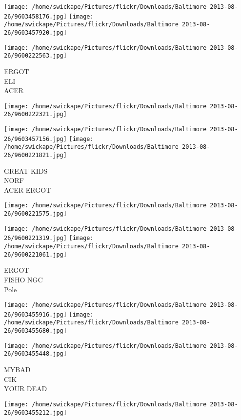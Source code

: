 \documentclass[10pt,letterpaper]{article}
\begin{document}
\texttt{[image: /home/swickape/Pictures/flickr/Downloads/Baltimore 2013-08-26/9603458176.jpg]}
\texttt{[image: /home/swickape/Pictures/flickr/Downloads/Baltimore 2013-08-26/9603457920.jpg]}

\texttt{[image: /home/swickape/Pictures/flickr/Downloads/Baltimore 2013-08-26/9600222563.jpg]}

ERGOT\\
ELI\\
ACER\\
\pagebreak

\texttt{[image: /home/swickape/Pictures/flickr/Downloads/Baltimore 2013-08-26/9600222321.jpg]}

\vspace{0.25in}
\texttt{[image: /home/swickape/Pictures/flickr/Downloads/Baltimore 2013-08-26/9603457156.jpg]}
\texttt{[image: /home/swickape/Pictures/flickr/Downloads/Baltimore 2013-08-26/9600221821.jpg]}

GREAT KIDS\\
NORF\\
ACER ERGOT\\
\pagebreak

\texttt{[image: /home/swickape/Pictures/flickr/Downloads/Baltimore 2013-08-26/9600221575.jpg]}

\vspace{0.25in}
\texttt{[image: /home/swickape/Pictures/flickr/Downloads/Baltimore 2013-08-26/9600221319.jpg]}
\texttt{[image: /home/swickape/Pictures/flickr/Downloads/Baltimore 2013-08-26/9600221061.jpg]}

ERGOT\\
FISHO NGC\\
Pole\\
\pagebreak

\texttt{[image: /home/swickape/Pictures/flickr/Downloads/Baltimore 2013-08-26/9603455916.jpg]}
\texttt{[image: /home/swickape/Pictures/flickr/Downloads/Baltimore 2013-08-26/9603455680.jpg]}

\texttt{[image: /home/swickape/Pictures/flickr/Downloads/Baltimore 2013-08-26/9603455448.jpg]}

MYBAD\\
CIK\\
YOUR DEAD\\
\pagebreak

\texttt{[image: /home/swickape/Pictures/flickr/Downloads/Baltimore 2013-08-26/9603455212.jpg]}
\end{document}
